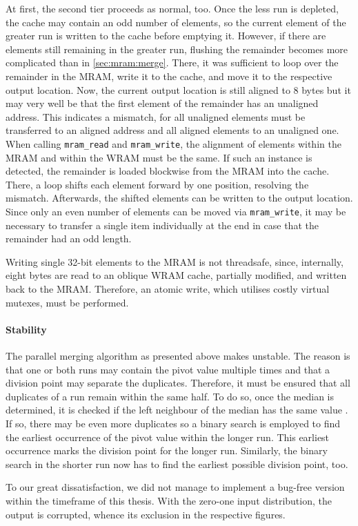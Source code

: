 At first, the second tier proceeds as normal, too.
Once the less run is depleted, the cache may contain an odd number of elements, so the current element of the greater run is written to the cache before emptying it.
However, if there are elements still remaining in the greater run, flushing the remainder becomes more complicated than in \cref{sec:mram:merge}.
There, it was sufficient to loop over the remainder in the \ac{MRAM}, write it to the cache, and move it to the respective output location.
Now, the current output location is still aligned to 8 bytes but it may very well be that the first element of the remainder has an unaligned address.
This indicates a mismatch, for all unaligned elements must be transferred to an aligned address and all aligned elements to an unaligned one.
When calling \lstinline|mram_read| and \lstinline|mram_write|, the alignment of elements within the \ac{MRAM} and within the \ac{WRAM} must be the same.
If such an instance is detected, the remainder is loaded blockwise from the \ac{MRAM} into the cache.
There, a loop shifts each element forward by one position, resolving the mismatch.
Afterwards, the shifted elements can be written to the output location.
Since only an even number of elements can be moved via \lstinline|mram_write|, it may be necessary to transfer a single item individually at the end in case that the remainder had an odd length.

Writing single 32-bit elements to the \ac{MRAM} is not threadsafe, since, internally, eight bytes are read to an oblique \ac{WRAM} cache, partially modified, and written back to the \ac{MRAM}.
Therefore, an atomic write, which utilises costly virtual mutexes, must be performed.


\paragraph{Stability}
The parallel merging algorithm as presented above makes \MS{} unstable.
The reason is that one or both runs may contain the pivot value multiple times and that a division point may separate the duplicates.
Therefore, it must be ensured that all duplicates of a run remain within the same half.
To do so, once the median is determined, it is checked if the left neighbour of the median has the same value .
If so, there may be even more duplicates so a binary search is employed to find the earliest occurrence of the pivot value within the longer run.
This earliest occurrence marks the division point for the longer run.
Similarly, the binary search in the shorter run now has to find the earliest possible division point, too.

To our great dissatisfaction, we did not manage to implement a bug-free version within the timeframe of this thesis.
With the zero-one input distribution, the output is corrupted, whence its exclusion in the respective figures.
